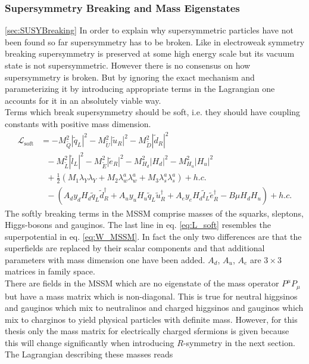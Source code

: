 \subsubsection{Supersymmetry Breaking and Mass Eigenstates}\ref{sec:SUSYBreaking}
In order to explain why supersymmetric particles have not been found so far supersymmetry has to be broken. Like in electroweak symmetry breaking supersymmetry is preserved at some high energy scale but its vacuum state is not supersymmetric. However there is no consensus on how supersymmetry is broken. But by ignoring the exact mechanism and parameterizing it by introducing appropriate terms in the Lagrangian one accounts for it in an absolutely viable way.\\
Terms which break supersymmetry should be soft, i.e. they should have coupling constants with positive mass dimension.
\begin{align}
\mathcal{L}_{\mathrm{soft}} &= -M^2_{\tilde{Q}}|\tilde{q}_L|^2 - M^2_{\tilde{U}}|\tilde{u}_R|^2 - M^2_{\tilde{D}}|\tilde{d}_R|^2 \nonumber\\
&\ \ \ - M^2_{\tilde{L}}|\tilde{l}_L|^2 - M^2_{\tilde{E}}|\tilde{e}_R|^2 - M^2_{H_d}|H_d|^2 - M^2_{H_u}|H_u|^2\nonumber\\
&\ \ \ +\frac{1}{2}\left( M_1 \lambda_Y\lambda_Y + M_2 \lambda_w^a\lambda_w^a + M_3 \lambda_s^a\lambda_s^a\right) + h.c.\nonumber\\
&\ \ \ -\left( A_d y_d H_d \tilde{q}_L \tilde{d}^\dagger_R + A_u y_u H_u \tilde{q}_L \tilde{u}^\dagger_R + A_e y_e H_d \tilde{l}_L \tilde{e}^\dagger_R -B\mu H_d H_u \right) + h.c.\label{eq:L_soft}
\end{align}
The softly breaking terms in the MSSM comprise masses of the squarks, sleptons, Higgs-bosons and gauginos. The last line in eq. \eqref{eq:L_soft} resembles the superpotential in eq. \eqref{eq:W_MSSM}. In fact the only two differences are that the superfields are replaced by their scalar components and that additional parameters with mass dimension one have been added. $A_d$, $A_u$, $A_e$ are $3 \times 3$ matrices in family space.\\
There are fields in the MSSM which are no eigenstate of the mass operator $P^\mu P_\mu$ but have a mass matrix which is non-diagonal. This is true for neutral higgsinos and gauginos which mix to neutralinos and charged higgsinos and gauginos which mix to charginos to yield physical particles with definite mass. However, for this thesis only the mass matrix for electrically charged sfermions is given because this will change significantly when introducing $R$-symmetry in the next section. The Lagrangian describing these masses reads
